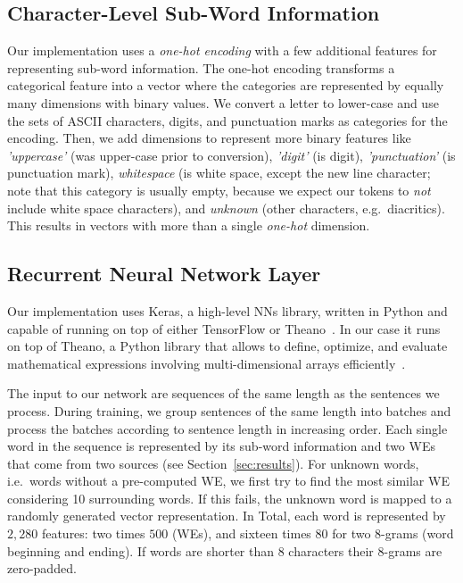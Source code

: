 \documentclass[11pt]{article}
\begin{document}
\subsection{Character-Level Sub-Word Information} %

Our implementation uses a \emph{one-hot encoding} with a few additional
features for representing sub-word information.
The one-hot encoding transforms a categorical feature into a vector where
the categories are represented by equally many dimensions with binary values.
We convert a letter to lower-case and use the sets of ASCII characters, digits,
and punctuation marks as categories for the encoding.
Then, we add dimensions to represent more binary features like
\emph{'uppercase'} (was upper-case prior to conversion), \emph{'digit'} (is
digit), \emph{'punctuation'} (is punctuation mark), \emph{whitespace} (is white
space, except the new line character; note that this category is usually empty,
because we expect our tokens to \emph{not} include white space characters), and
\emph{unknown} (other characters, e.g.~diacritics).
This results in vectors with more than a single \emph{one-hot} dimension. 
%

\subsection{Recurrent Neural Network Layer} %

Our implementation uses Keras, a high-level NNs library, written in Python and
capable of running on top of either TensorFlow or Theano~\cite{chollet2015}. 
In our case it runs on top of Theano, a Python library that allows to define,
optimize, and evaluate mathematical expressions involving multi-dimensional
arrays efficiently~\cite{Theano2016}.

The input to our network are sequences of the same length as the sentences we
process.
During training, we group sentences of the same length into batches and process
the batches according to sentence length in increasing order.
Each single word in the sequence is represented by its sub-word information and
two WEs that come from two sources (see Section~\ref{sec:results}).
For unknown words, i.e.~words without a pre-computed WE, we first try to
find the most similar WE considering 10 surrounding words.  
If this fails, the unknown word is mapped to a randomly generated vector
representation.
In Total, each word is represented by $2,280$ features: two times $500$ (WEs),
and sixteen times $80$ for two 8-grams (word beginning and ending).
If words are shorter than 8 characters their 8-grams are zero-padded.
\end{document}

